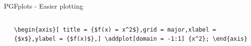 \documentclass[aspectratio=169]{beamer}
\begin{document}
\begin{frame}{PGFplots - Easier plotting}
    \begin{columns}[T]
        \begin{column}{.48\textwidth}
        \end{column}\hfill
        \begin{column}{.48\textwidth}
            \vspace{40pt}
            \texttt{\textbackslash begin\{axis\}[
            title = \{\$f(x) = x\^{}2\$\},grid = major,xlabel = \{\$x\$\},ylabel = \{\$f(x)\$\},]
            \textbackslash addplot[domain = -1:1] \{x\^{}2\}; \textbackslash end\{axis\}}
        \end{column}
    \end{columns}
\end{frame}
\end{document}

